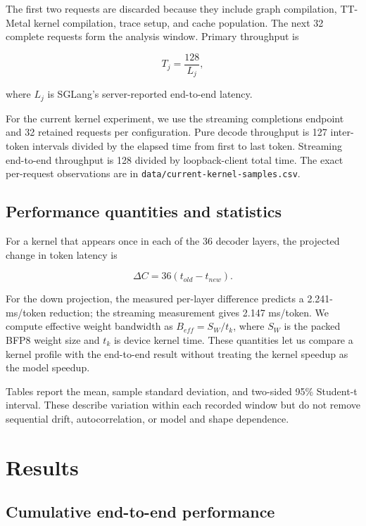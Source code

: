 \documentclass[
  10pt,
  american,
  10pt,
  letterpaper]{article}
\begin{document}
The first two requests are discarded because they include graph
compilation, TT-Metal kernel compilation, trace setup, and cache
population. The next 32 complete requests form the analysis window.
Primary throughput is

\[T_j=\frac{128}{L_j},\]

where \(L_j\) is SGLang's server-reported end-to-end latency.

For the current kernel experiment, we use the streaming completions
endpoint and 32 retained requests per configuration. Pure decode
throughput is 127 inter-token intervals divided by the elapsed time from
first to last token. Streaming end-to-end throughput is 128 divided by
loopback-client total time. The exact per-request observations are in
\texttt{data/current-kernel-samples.csv}.

\hypertarget{performance-quantities-and-statistics}{%
\subsection{Performance quantities and
statistics}\label{performance-quantities-and-statistics}}

For a kernel that appears once in each of the 36 decoder layers, the
projected change in token latency is

\[
\Delta C = 36\left(t_{old}-t_{new}\right).
\]

For the down projection, the measured per-layer difference predicts a
2.241-ms/token reduction; the streaming measurement gives 2.147
ms/token. We compute effective weight bandwidth as \(B_{eff}=S_W/t_k\),
where \(S_W\) is the packed BFP8 weight size and \(t_k\) is device
kernel time. These quantities let us compare a kernel profile with the
end-to-end result without treating the kernel speedup as the model
speedup.

Tables report the mean, sample standard deviation, and two-sided 95\%
Student-t interval. These describe variation within each recorded window
but do not remove sequential drift, autocorrelation, or model and shape
dependence.

\hypertarget{results}{%
\section{Results}\label{results}}

\hypertarget{cumulative-end-to-end-performance}{%
\subsection{Cumulative end-to-end
performance}\label{cumulative-end-to-end-performance}}
\end{document}
